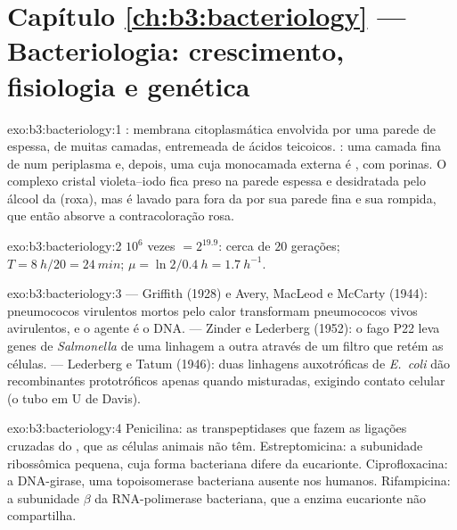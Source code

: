\section*{Capítulo \ref{ch:b3:bacteriology} --- Bacteriologia: crescimento, fisiologia e genética}

\begin{solution}{exo:b3:bacteriology:1}
: membrana citoplasmática envolvida por uma parede de
 espessa, de muitas camadas, entremeada de ácidos
teicoicos. : uma camada fina de  num
periplasma e, depois, uma  cuja monocamada externa é
, com porinas. O complexo cristal violeta--iodo fica
preso na parede espessa e desidratada pelo álcool da 
(roxa), mas é lavado para fora da  por sua parede fina e
sua  rompida, que então absorve a contracoloração rosa.
\end{solution}

\begin{solution}{exo:b3:bacteriology:2}
$10^{6}$ vezes $= 2^{19.9}$: cerca de $20$ gerações;
$T = \qty{8}{h}/20
= \qty{24}{min}$;
$\mu = \ln 2/\qty{0.4}{h} = \qty{1.7}{h^{-1}}$.
\end{solution}

\begin{solution}{exo:b3:bacteriology:3}
 --- Griffith (1928) e Avery, MacLeod e McCarty (1944):
pneumococos virulentos mortos pelo calor transformam pneumococos vivos
avirulentos, e o agente é o DNA.  --- Zinder e Lederberg
(1952): o fago P22 leva genes de \emph{Salmonella} de uma linhagem a
outra através de um filtro que retém as células.  ---
Lederberg e Tatum (1946): duas linhagens auxotróficas de
\emph{E.~coli} dão recombinantes prototróficos apenas quando
misturadas, exigindo contato celular (o tubo em U de Davis).
\end{solution}

\begin{solution}{exo:b3:bacteriology:4}
Penicilina: as transpeptidases que fazem as ligações cruzadas do
, que as células animais não têm. Estreptomicina: a
subunidade ribossômica pequena, cuja forma bacteriana difere da
eucarionte. Ciprofloxacina: a DNA-girase, uma topoisomerase bacteriana
ausente nos humanos. Rifampicina: a subunidade $\beta$ da
RNA-polimerase bacteriana, que a enzima eucarionte não compartilha.
\end{solution}

